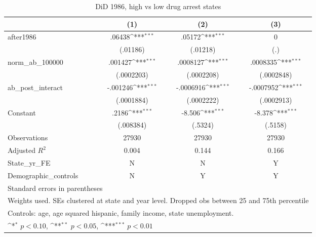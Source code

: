 \begin{table}[htbp]\centering
\def\sym#1{\ifmmode^{#1}\else\(^{#1}\)\fi}
\caption{DiD 1986, high vs low drug arrest states}
\begin{tabular}{l*{3}{c}}
\hline\hline
                    &\multicolumn{1}{c}{(1)}         &\multicolumn{1}{c}{(2)}         &\multicolumn{1}{c}{(3)}         \\
\hline
after1986           &      .06438\sym{***}&      .05172\sym{***}&           0         \\
                    &    (.01186)         &    (.01218)         &         (.)         \\
[1em]
norm\_ab\_100000      &     .001427\sym{***}&    .0008127\sym{***}&    .0008335\sym{***}\\
                    &  (.0002203)         &  (.0002208)         &  (.0002848)         \\
[1em]
ab\_post\_interact    &    -.001246\sym{***}&   -.0006916\sym{***}&   -.0007952\sym{***}\\
                    &  (.0001884)         &  (.0002222)         &  (.0002913)         \\
[1em]
Constant            &       .2186\sym{***}&      -8.506\sym{***}&      -8.378\sym{***}\\
                    &   (.008384)         &     (.5324)         &     (.5158)         \\
\hline
Observations        &       27930         &       27930         &       27930         \\
Adjusted \(R^{2}\)  &       0.004         &       0.144         &       0.166         \\
State\_yr\_FE         &           N         &           N         &           Y         \\
Demographic\_controls&           N         &           Y         &           Y         \\
\hline\hline
\multicolumn{4}{l}{\footnotesize Standard errors in parentheses}\\
\multicolumn{4}{l}{\footnotesize Weights used. SEs clustered at state and year level. Dropped obs between 25 and 75th percentile}\\
\multicolumn{4}{l}{\footnotesize Controls: age, age squared hispanic, family income, state unemployment.}\\
\multicolumn{4}{l}{\footnotesize \sym{*} \(p<0.10\), \sym{**} \(p<0.05\), \sym{***} \(p<0.01\)}\\
\end{tabular}
\end{table}
